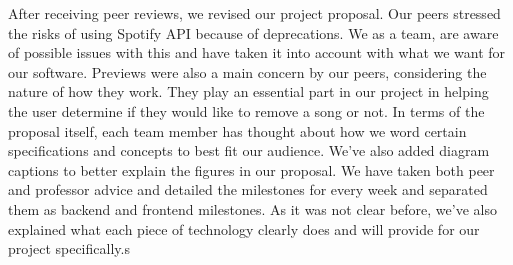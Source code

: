 \documentclass{article}
\begin{document}
\begin{appendices}
After receiving peer reviews, we revised our project proposal. Our peers stressed the risks of using Spotify API because of deprecations. We as a team, are aware of possible issues with this and have taken it into account with what we want for our software. Previews were also a main concern by our peers, considering the nature of how they work. They play an essential part in our project in helping the user determine if they would like to remove a song or not. In terms of the proposal itself, each team member has thought about how we word certain specifications and concepts to best fit our audience. We've also added diagram captions to better explain the figures in our proposal. We have taken both peer and professor advice and detailed the milestones for every week and separated them as backend and frontend milestones. As it was not clear before, we've also explained what each piece of technology clearly does and will provide for our project specifically.s

\end{appendices}

\end{document}
